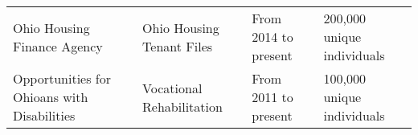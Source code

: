 \begin{longtable}[]{@{}llll@{}}
  \begin{minipage}[t]{0.19\columnwidth}\raggedright
  Ohio
  Housing
  Finance
  Agency\strut
  \end{minipage} & \begin{minipage}[t]{0.34\columnwidth}\raggedright
  Ohio Housing Tenant Files\strut
  \end{minipage} & \begin{minipage}[t]{0.18\columnwidth}\raggedright
  From 2014 to
  present\strut
  \end{minipage} & \begin{minipage}[t]{0.18\columnwidth}\raggedright
  200,000
  unique
  individuals\strut
  \end{minipage}\tabularnewline
  \begin{minipage}[t]{0.19\columnwidth}\raggedright
  Opportunities
  for
  Ohioans
  with
  Disabilities\strut
  \end{minipage} & \begin{minipage}[t]{0.34\columnwidth}\raggedright
  Vocational Rehabilitation\strut
  \end{minipage} & \begin{minipage}[t]{0.18\columnwidth}\raggedright
  From 2011 to
  present\strut
  \end{minipage} & \begin{minipage}[t]{0.18\columnwidth}\raggedright
  100,000
  unique
  individuals\strut
  \end{minipage}\tabularnewline
  \bottomrule
  \end{longtable}